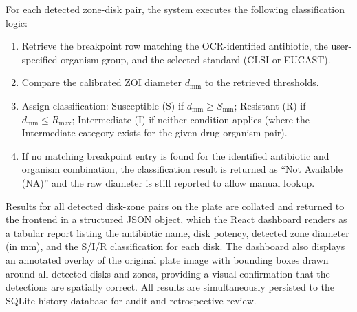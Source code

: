 For each detected zone-disk pair, the system executes the following classification logic:
\begin{enumerate}
  \item Retrieve the breakpoint row matching the OCR-identified antibiotic, the user-specified
        organism group, and the selected standard (CLSI or EUCAST).
  \item Compare the calibrated ZOI diameter $d_{\mathrm{mm}}$ to the retrieved thresholds.
  \item Assign classification: Susceptible (S) if $d_{\mathrm{mm}} \geq S_{\min}$;
        Resistant (R) if $d_{\mathrm{mm}} \leq R_{\max}$; Intermediate (I) if neither
        condition applies (where the Intermediate category exists for the given drug-organism pair).
  \item If no matching breakpoint entry is found for the identified antibiotic and organism
        combination, the classification result is returned as ``Not Available (NA)'' and
        the raw diameter is still reported to allow manual lookup.
\end{enumerate}

Results for all detected disk-zone pairs on the plate are collated and returned to the frontend
in a structured JSON object, which the React dashboard renders as a tabular report listing the
antibiotic name, disk potency, detected zone diameter (in mm), and the S/I/R classification
for each disk. The dashboard also displays an annotated overlay of the original plate image
with bounding boxes drawn around all detected disks and zones, providing a visual confirmation
that the detections are spatially correct. All results are simultaneously persisted to the
SQLite history database for audit and retrospective review.
